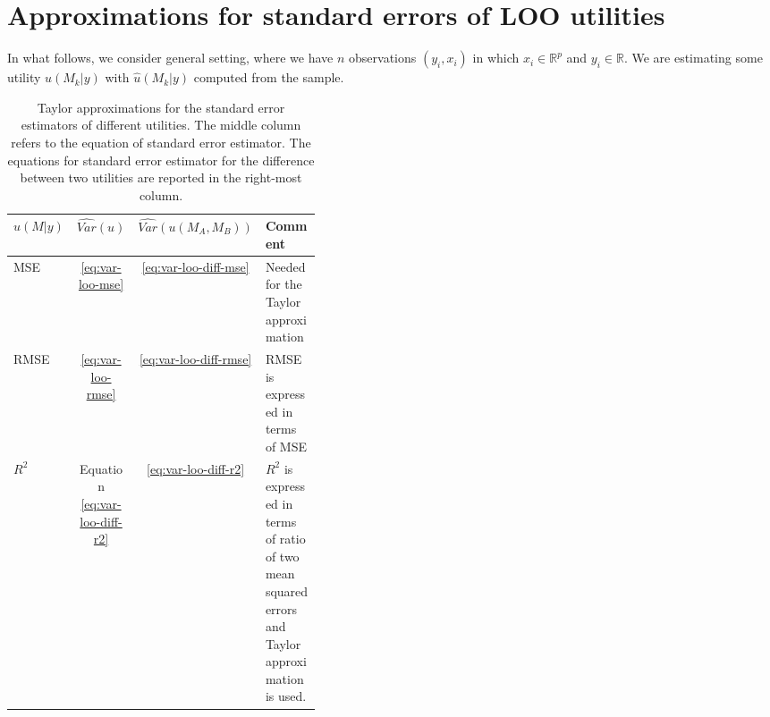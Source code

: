 \documentclass{article}
\begin{document}
\section{Approximations for standard errors of LOO utilities}
In what follows, we consider general setting, where we have $n$ observations $(y_i, x_i)$ in which $x_i \in \mathbb{R}^p$ and $y_i \in \mathbb{R}$. We are estimating some utility $u(M_k | y)$ with $\hat{u}(M_k |y)$ computed from the sample.

\begin{table}[]
    \centering
    \begin{tabular}{l c c p{0.4\linewidth}}
    \toprule
    $u(M | y)$ & $\widehat{Var}(u)$  & $\widehat{Var}(u(M_A, M_B))$ & Comment \\ \midrule
    MSE & \eqref{eq:var-loo-mse} & \eqref{eq:var-loo-diff-mse} & Needed for the Taylor approximation\\
    RMSE  & \eqref{eq:var-loo-rmse} & \eqref{eq:var-loo-diff-rmse} & RMSE is expressed in terms of MSE\\
    $R^2$ & Equation \eqref{eq:var-loo-diff-r2} & \eqref{eq:var-loo-diff-r2} & $R^2$ is expressed in terms of ratio of two mean squared errors and Taylor approximation is used.
    \end{tabular}
    \caption{Taylor approximations for the standard error estimators of different utilities. The middle column refers to the equation of standard error estimator. The equations for standard error estimator for the difference between two utilities are reported in the right-most column.}
    \label{tbl:se-approximations}
\end{table}

\end{document}
